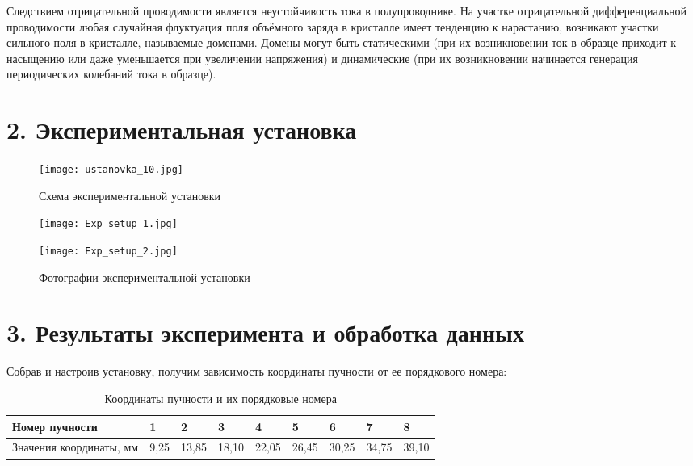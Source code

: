 \documentclass[a4paper,12pt]{report}
\begin{document}
Следствием отрицательной проводимости является неустойчивость тока в полупроводнике. На участке отрицательной дифференциальной проводимости любая случайная флуктуация поля объёмного заряда в кристалле имеет тенденцию к нарастанию, возникают участки сильного поля в кристалле, называемые доменами. Домены могут быть статическими (при их возникновении ток в образце приходит к насыщению или даже уменьшается при увеличении напряжения) и динамические (при их возникновении начинается генерация периодических колебаний тока в образце).


\section*{2. Экспериментальная установка}
\begin{figure}[H]
    \centering
    \texttt{[image: ustanovka\_10.jpg]}
    \caption{Схема экспериментальной установки} \label{ustanovka}
\end{figure}

\begin{figure}[H]
    \centering
    \begin{minipage}[H]{0.49\linewidth}
        \texttt{[image: Exp\_setup\_1.jpg]}
        \label{fig:exp_set_1}
    \end{minipage}
    \begin{minipage}[H]{0.49\linewidth}
        \texttt{[image: Exp\_setup\_2.jpg]} 
        \label{fig:exp_set_2}
    \end{minipage}
    \caption{Фотографии экспериментальной установки}
\end{figure}

\section*{3. Результаты эксперимента и обработка данных}
Собрав и настроив установку, получим зависимость координаты пучности от ее порядкового номера:

\begin{table}[H]
\begin{tabular}{|l|l|l|l|l|l|l|l|l|}
\hline
Номер пучности      & 1    & 2     & 3     & 4     & 5     & 6     & 7     & 8     \\ \hline
Значения координаты, мм & 9,25 & 13,85 & 18,10 & 22,05 & 26,45 & 30,25 & 34,75 & 39,10 \\ \hline
\end{tabular}
\caption{Координаты пучности и их порядковые номера}
\label{tab_1}
\end{table}
\end{document}

